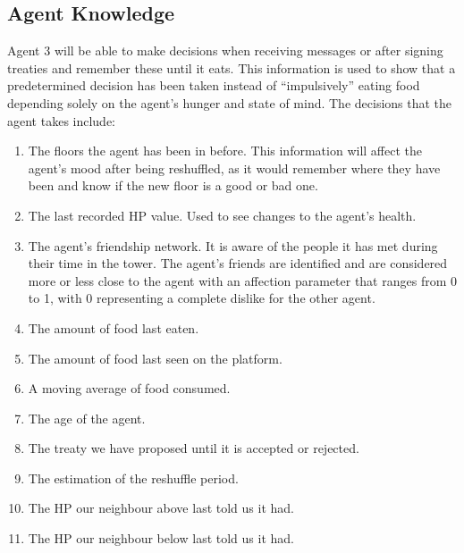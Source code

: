 \subsection{Agent Knowledge}
Agent 3 will be able to make decisions when receiving messages or after signing treaties and remember these until it eats. This information is used to show that a predetermined decision has been taken instead of “impulsively” eating food depending solely on the agent’s hunger and state of mind. The decisions that the agent takes include:
\begin{enumerate}
    \item The floors the agent has been in before. This information will affect the agent’s mood after being reshuffled, as it would remember where they have been and know if the new floor is a good or bad one.  
    \item The last recorded HP value. Used to see changes to the agent's health.
    \item The agent’s friendship network. It is aware of the people it has met during their time in the tower. The agent’s friends are identified and are considered more or less close to the agent with an affection parameter that ranges from 0 to 1, with 0  representing a complete dislike for the other agent.
    \item The amount of food last eaten.
    \item The amount of food last seen on the platform.
    \item A moving average of food consumed.
    \item The age of the agent.
    \item The treaty we have proposed until it is accepted or rejected.
    \item The estimation of the reshuffle period.
    \item The HP our neighbour above last told us it had.
    \item The HP our neighbour below last told us it had.
\end{enumerate}

